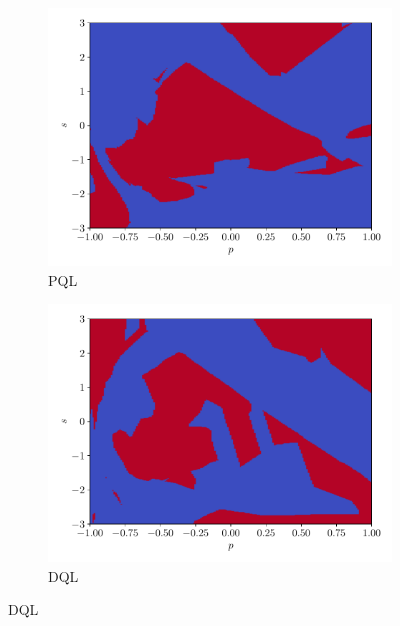 \documentclass[a4paper, 12pt]{article}
\begin{document}
    \begin{figure}[h]
        \centering
        \hfill
        \begin{subfigure}{0.49\textwidth}
            \centering
            \includegraphics[width=\textwidth]{resources/pdf/5_mu_PQL_Adam.pdf}
            \caption{PQL}
        \end{subfigure}
        \hfill
        \begin{subfigure}{0.49\textwidth}
            \centering
            \includegraphics[width=\textwidth]{resources/pdf/5_mu_DQL_Adam.pdf}
            \caption{DQL}
        \end{subfigure}
        \label{fig:pql.dql.adam.mu}
    \end{figure}
    
\end{document}
